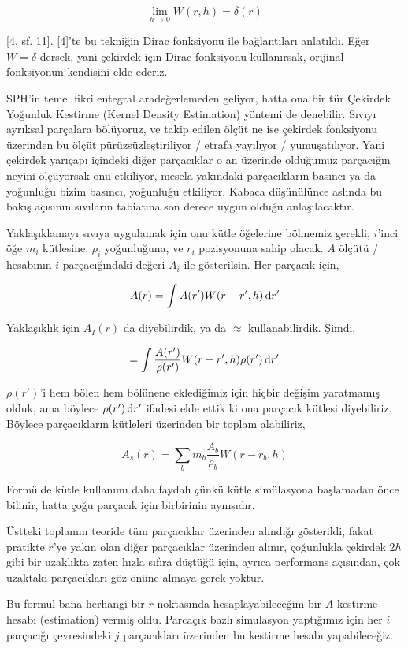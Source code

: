 \documentclass[12pt,fleqn]{article}\usepackage{../../common}
\begin{document}
$$
\lim_{h \to 0} W(r,h) = \delta(r)
$$

[4, sf. 11]. [4]'te bu tekniğin Dirac fonksiyonu ile bağlantıları
anlatıldı. Eğer $W = \delta$ dersek, yani çekirdek için Dirac fonksiyonu
kullanırsak, orijinal fonksiyonun kendisini elde ederiz.

SPH'in temel fikri entegral aradeğerlemeden geliyor, hatta ona bir tür Çekirdek
Yoğunluk Kestirme (Kernel Density Estimation) yöntemi de denebilir. Sıvıyı
ayrıksal parçalara bölüyoruz, ve takip edilen ölçüt ne ise çekirdek fonksiyonu
üzerinden bu ölçüt pürüzsüzleştiriliyor / etrafa yayılıyor / yumuşatılıyor. Yani
çekirdek yarıçapı içindeki diğer parçacıklar o an üzerinde olduğumuz parçacığın
neyini ölçüyorsak onu etkiliyor, mesela yakındaki parçacıkların basıncı ya da
yoğunluğu bizim basıncı, yoğunluğu etkiliyor. Kabaca düşünülünce aslında bu
bakış açısının sıvıların tabiatına son derece uygun olduğu anlaşılacaktır.

Yaklaşıklamayı sıvıya uygulamak için onu kütle öğelerine bölmemiz gerekli,
$i$'inci öğe $m_i$ kütlesine, $\rho_i$ yoğunluğuna, ve $r_i$ pozisyonuna sahip
olacak. $A$ ölçütü / hesabının $i$ parçacığındaki değeri $A_i$ ile
gösterilsin. Her parçacık için,

$$
A(r) = \int A(r') W(r-r',h) \,\mathrm{d} r'
$$

Yaklaşıklık için $A_I(r)$ da diyebilirdik, ya da $\approx$
kullanabilirdik. Şimdi,

$$
 = \int \frac{A(r')}{\rho(r')} W(r-r',h) \rho(r') \,\mathrm{d} r'
$$

$\rho(r')$'i hem bölen hem bölünene eklediğimiz için hiçbir değişim yaratmamış
olduk, ama böylece $\rho(r') \,\mathrm{d} r'$ ifadesi elde ettik ki ona parçacık kütlesi
diyebiliriz. Böylece parçacıkların kütleleri üzerinden bir toplam alabiliriz,

$$
A_s(r) = \sum_b m_b \frac{A_b}{\rho_b} W(r-r_b, h)
$$

Formülde kütle kullanımı daha faydalı çünkü kütle simülasyona başlamadan önce
bilinir, hatta çoğu parçacık için birbirinin aynısıdır. 

Üstteki toplamın teoride tüm parçacıklar üzerinden alındığı gösterildi, fakat
pratikte $r$'ye yakın olan diğer parçacıklar üzerinden alınır, çoğunlukla
çekirdek $2h$ gibi bir uzaklıkta zaten hızla sıfıra düştüğü için, ayrıca
performans açısından, çok uzaktaki parçacıkları göz önüne almaya gerek yoktur.

Bu formül bana herhangi bir $r$ noktasında hesaplayabileceğim bir $A$ kestirme
hesabı (estimation) vermiş oldu. Parcaçık bazlı simulasyon yaptığımız için her
$i$ parçacığı çevresindeki $j$ parçacıkları üzerinden bu kestirme hesabı
yapabileceğiz.
\end{document}
